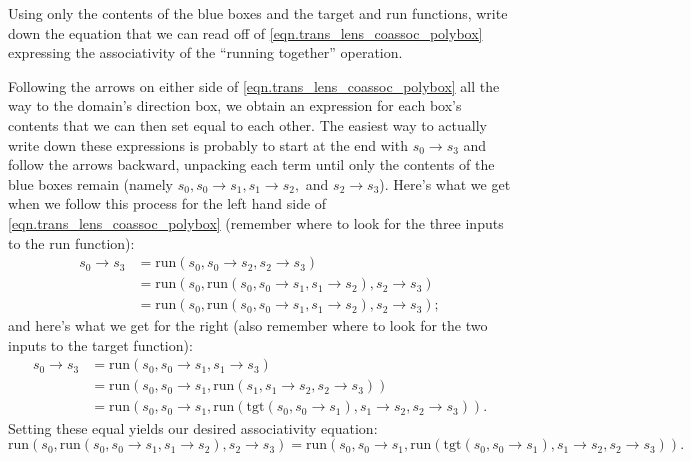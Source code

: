 \documentclass[Book-Poly]{subfiles}
\begin{document}
\begin{exercise}
Using only the contents of the blue boxes and the target and run functions, write down the equation that we can read off of \eqref{eqn.trans_lens_coassoc_polybox} expressing the associativity of the ``running together'' operation.
\begin{solution}
Following the arrows on either side of \eqref{eqn.trans_lens_coassoc_polybox} all the way to the domain's direction box, we obtain an expression for each box's contents that we can then set equal to each other.
The easiest way to actually write down these expressions is probably to start at the end with $s_0\to s_3$ and follow the arrows backward, unpacking each term until only the contents of the blue boxes remain (namely $s_0, s_0\to s_1, s_1\to s_2,$ and $s_2\to s_3$).
Here's what we get when we follow this process for the left hand side of \eqref{eqn.trans_lens_coassoc_polybox} (remember where to look for the three inputs to the run function):
\begin{align*}
    s_0\to s_3&=\text{run}(s_0,s_0\to s_2,s_2\to s_3)\\
    &=\text{run}(s_0,\text{run}(s_0,s_0\to s_1,s_1\to s_2),s_2\to s_3)\\
    &=\text{run}(s_0,\text{run}(s_0,s_0\to s_1,s_1\to s_2),s_2\to s_3);
\end{align*}
and here's what we get for the right (also remember where to look for the two inputs to the target function):
\begin{align*}
    s_0\to s_3&=\text{run}(s_0,s_0\to s_1,s_1\to s_3)\\
    &=\text{run}(s_0,s_0\to s_1,\text{run}(s_1,s_1\to s_2,s_2\to s_3))\\
    &=\text{run}(s_0,s_0\to s_1,\text{run}(\text{tgt}(s_0,s_0\to s_1),s_1\to s_2,s_2\to s_3)).
\end{align*}
Setting these equal yields our desired associativity equation:
\[
    \text{run}(s_0,\text{run}(s_0,s_0\to s_1,s_1\to s_2),s_2\to s_3)=\text{run}(s_0,s_0\to s_1,\text{run}(\text{tgt}(s_0,s_0\to s_1),s_1\to s_2,s_2\to s_3)).
\]
\end{solution}
\end{exercise}
\end{document}
